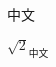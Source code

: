 \documentclass{article}
\begin{document}
\begin{CJK}{UTF8}{bsmi}       %

中文

$\sqrt{2}_{\text{中文}}$      %

\end{CJK}
\end{document}
